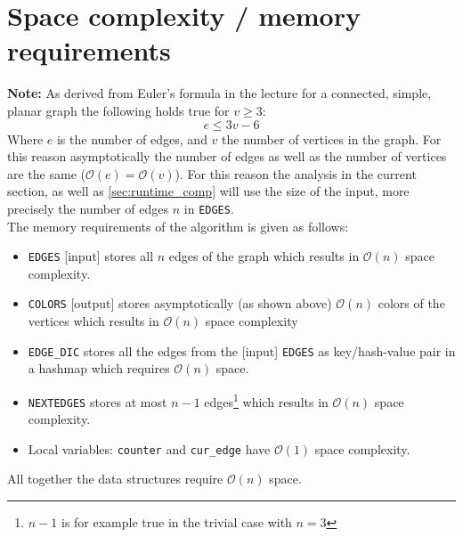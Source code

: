 \documentclass[english]{scrartcl}
\newcommand{\code}{\texttt}
\begin{document}
\section{Space complexity / memory requirements}
\label{sec:space_compl}
\textbf{Note:} As derived from Euler's formula in the lecture for a connected, simple, planar graph the following holds true for $v \geq 3$:
\begin{equation}
    \label{eq:euler}
    e \leq 3 v-6 
\end{equation}
Where $e$ is the number of edges, and $v$ the number of vertices in the graph. For this reason asymptotically the number of edges as well as the number of vertices are the same ($\mathcal{O}(e) = \mathcal{O}(v)$). 
For this reason the analysis in the current section, as well as \autoref{sec:runtime_comp} will use the size of the input, more precisely the number of edges $n$ in \code{EDGES}.\\
\newline
The memory requirements of the algorithm is given as follows:
\begin{itemize}
    \item \code{EDGES} [input] stores all $n$ edges of the graph which results in $\mathcal{O}(n)$ space complexity.
    \item \code{COLORS} [output] stores asymptotically (as shown above) $\mathcal{O}(n)$ colors of the vertices which results in $\mathcal{O}(n)$ space complexity
    \item \code{EDGE\_DIC} stores all the edges from the [input] \code{EDGES} as key/hash-value pair in a hashmap which requires $\mathcal{O}(n)$ space. 
    \item \code{NEXTEDGES} stores at most $n-1$ edges\footnote{$n-1$ is for example true in the trivial case with $n=3$} which results in $\mathcal{O}(n)$ space complexity.
    \item Local variables: \code{counter} and \code{cur\_edge} have $\mathcal{O}(1)$ space complexity.
\end{itemize}
All together the data structures require $\mathcal{O}(n)$ space. 
\end{document}
